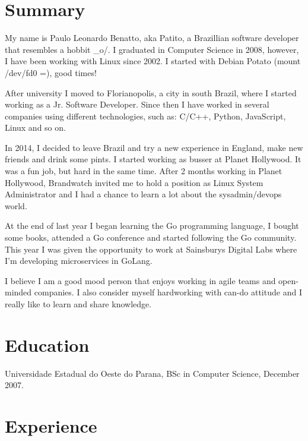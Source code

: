 \documentclass[margin]{res}
\begin{document}
  

\address{Brighton, UK \\ benatto@gmail.com \\ Phone: +44 07533998484 \\ Post Code: BN21HF }
                           
                        
\begin{resume}                        
 
\section{Summary} My name is Paulo Leonardo Benatto, aka Patito, a Brazillian software developer that resembles a hobbit \_o/. I graduated in Computer Science in 2008, however, I have been working with Linux since 2002. I started with Debian Potato (mount /dev/fd0 =), good times!   

After university I moved to Florianopolis, a city in south Brazil, where I started working as a Jr. Software Developer. Since then I have worked in several companies using different technologies, such as: C/C++, Python, JavaScript, Linux and so on.

In 2014, I decided to leave Brazil and try a new experience in England, make new friends and drink some pints. I started working as busser at Planet Hollywood. It was a fun job, but hard in the same time. After 2 months working in Planet Hollywood, Brandwatch invited me to hold a position as Linux System Administrator and I had a chance to learn a lot about the sysadmin/devops world.

At the end of last year I began learning the Go programming language, I bought some books, attended a Go conference and started following the Go community. This year I was given the opportunity to work at Sainsburys Digital Labs where I’m developing microservices in GoLang.

I believe I am a good mood person that enjoys working in agile teams and open-minded companies. I also consider myself hardworking with can-do attitude and I really like to learn and share knowledge.
 
\section{Education}	Universidade Estadual do Oeste do Parana, BSc in Computer Science, December 2007.
  
\section{Experience}


\end{resume}
\end{document}
